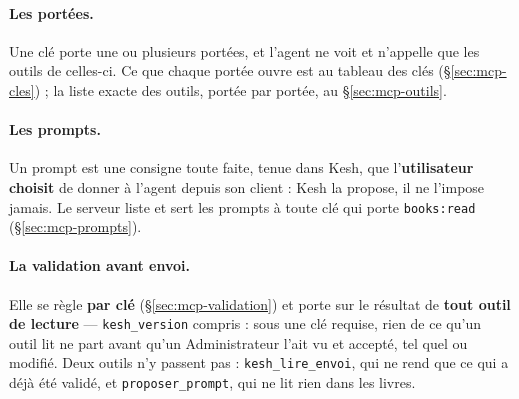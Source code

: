 \documentclass[a4paper,11pt,oneside]{article}
\begin{document}
\paragraph{Les portées.} Une clé porte une ou plusieurs portées, et l'agent ne voit et n'appelle que les outils de celles-ci. Ce que chaque portée ouvre est au tableau des clés (\S\ref{sec:mcp-cles}) ; la liste exacte des outils, portée par portée, au \S\ref{sec:mcp-outils}.

\paragraph{Les prompts.} Un prompt est une consigne toute faite, tenue dans Kesh, que l'\textbf{utilisateur choisit} de donner à l'agent depuis son client : Kesh la propose, il ne l'impose jamais. Le serveur liste et sert les prompts à toute clé qui porte \texttt{books:read} (\S\ref{sec:mcp-prompts}).

\paragraph{La validation avant envoi.} Elle se règle \textbf{par clé} (\S\ref{sec:mcp-validation}) et porte sur le résultat de \textbf{tout outil de lecture} --- \texttt{kesh\_version} compris : sous une clé requise, rien de ce qu'un outil lit ne part avant qu'un Administrateur l'ait vu et accepté, tel quel ou modifié. Deux outils n'y passent pas : \texttt{kesh\_lire\_envoi}, qui ne rend que ce qui a déjà été validé, et \texttt{proposer\_prompt}, qui ne lit rien dans les livres.
\end{document}
